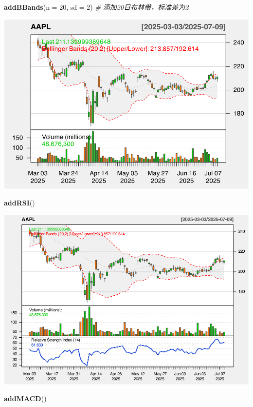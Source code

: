 \documentclass[]{ctexbook}
\newenvironment{Shaded}{\begin{snugshade}}{\end{snugshade}}
\newcommand{\AttributeTok}[1]{\textcolor[rgb]{0.13,0.29,0.53}{#1}}
\newcommand{\CommentTok}[1]{\textcolor[rgb]{0.56,0.35,0.01}{\textit{#1}}}
\newcommand{\DecValTok}[1]{\textcolor[rgb]{0.00,0.00,0.81}{#1}}
\newcommand{\FunctionTok}[1]{\textcolor[rgb]{0.13,0.29,0.53}{\textbf{#1}}}
\newcommand{\NormalTok}[1]{#1}
\begin{document}
\begin{Shaded}
\begin{Highlighting}[]
\FunctionTok{addBBands}\NormalTok{(}\AttributeTok{n =} \DecValTok{20}\NormalTok{, }\AttributeTok{sd =} \DecValTok{2}\NormalTok{)  }\CommentTok{\# 添加20日布林带，标准差为2  }
\end{Highlighting}
\end{Shaded}

\includegraphics[width=0.9\linewidth]{quantmod_files/figure-latex/bb_2-2}

\begin{Shaded}
\begin{Highlighting}[]
\FunctionTok{addRSI}\NormalTok{()}
\end{Highlighting}
\end{Shaded}

\includegraphics[width=0.9\linewidth]{quantmod_files/figure-latex/bb_2-3}

\begin{Shaded}
\begin{Highlighting}[]
\FunctionTok{addMACD}\NormalTok{()}
\end{Highlighting}
\end{Shaded}
\end{document}
